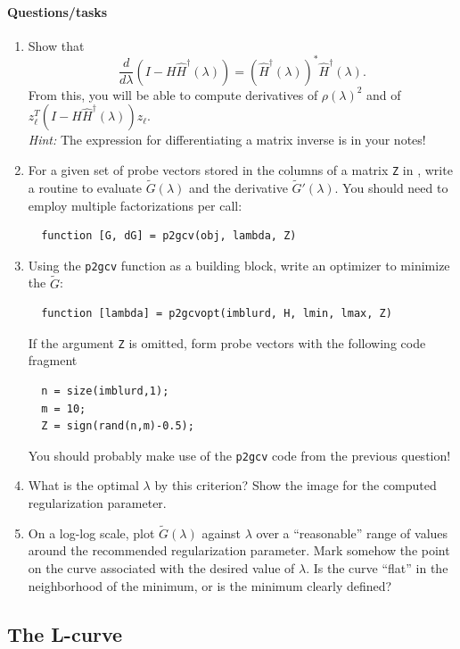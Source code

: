 \documentclass[12pt, leqno]{article} %
\begin{document}
\paragraph*{Questions/tasks}
\begin{enumerate}
\item
  Show that
  \[
    \frac{d}{d\lambda} \left( I-H \hat{H}^\dagger(\lambda) \right) =
    ( \hat{H}^\dagger(\lambda) )^* \hat{H}^\dagger(\lambda).
  \]
  From this, you will be able to compute derivatives of $\rho(\lambda)^2$
  and of $z_\ell^T (I-H \hat{H}^\dagger(\lambda)) z_{\ell}$. \\
  {\em Hint:} The expression for differentiating a matrix inverse
  is in your notes!
\item
  For a given set of probe vectors stored in the columns of a matrix
  {\tt Z} in \matlab, write a routine to evaluate $\tilde{G}(\lambda)$
  and the derivative $\tilde{G}'(\lambda)$.  You should need to employ
  multiple factorizations per call:
\begin{lstlisting}
  function [G, dG] = p2gcv(obj, lambda, Z)
\end{lstlisting}
\item
  Using the {\tt p2gcv} function as a building block, write an optimizer
  to minimize the $\tilde{G}$:
\begin{lstlisting}
  function [lambda] = p2gcvopt(imblurd, H, lmin, lmax, Z)
\end{lstlisting}
  If the argument {\tt Z} is omitted, form probe vectors with the following
  code fragment
\begin{lstlisting}
  n = size(imblurd,1);
  m = 10;
  Z = sign(rand(n,m)-0.5);
\end{lstlisting}
  You should probably make use of the {\tt p2gcv} code from the previous
  question!
\item
  What is the optimal $\lambda$ by this criterion?
  Show the image for the computed regularization parameter.
\item
  On a log-log scale, plot $\tilde{G}(\lambda)$ against $\lambda$ over
  a ``reasonable'' range of values around the recommended
  regularization parameter.  Mark somehow the point on the
  curve associated with the desired value of $\lambda$.  Is
  the curve ``flat'' in the neighborhood of the minimum, or
  is the minimum clearly defined?
\end{enumerate}

\subsection{The L-curve}
\end{document}
